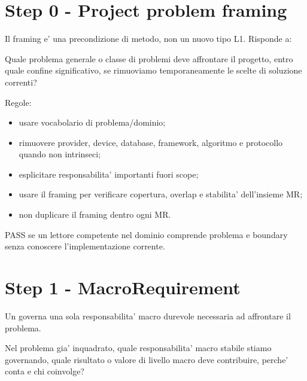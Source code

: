 \documentclass[11pt,a4paper]{article}
\begin{document}
\clearpage

\section{Step 0 - Project problem framing}
\closedtag

Il framing e' una precondizione di metodo, non un nuovo tipo L1. Risponde a:

\begin{ddtacheck}[title={Domanda fondamentale}]
Quale problema generale o classe di problemi deve affrontare il progetto, entro quale confine significativo, se rimuoviamo temporaneamente le scelte di soluzione correnti?
\end{ddtacheck}

Regole:
\begin{itemize}
  \item usare vocabolario di problema/dominio;
  \item rimuovere provider, device, database, framework, algoritmo e protocollo quando non intrinseci;
  \item esplicitare responsabilita' importanti fuori scope;
  \item usare il framing per verificare copertura, overlap e stabilita' dell'insieme MR;
  \item non duplicare il framing dentro ogni MR.
\end{itemize}

\begin{ddtacheck}[title={Gate D0}]
PASS se un lettore competente nel dominio comprende problema e boundary senza conoscere l'implementazione corrente.
\end{ddtacheck}

\section{Step 1 - MacroRequirement}
\closedtag

Un \MR{} governa una sola responsabilita' macro durevole necessaria ad affrontare il problema.

\begin{ddtacheck}[title={Domanda fondamentale}]
Nel problema gia' inquadrato, quale responsabilita' macro stabile stiamo governando, quale risultato o valore di livello macro deve contribuire, perche' conta e chi coinvolge?
\end{ddtacheck}
\end{document}
